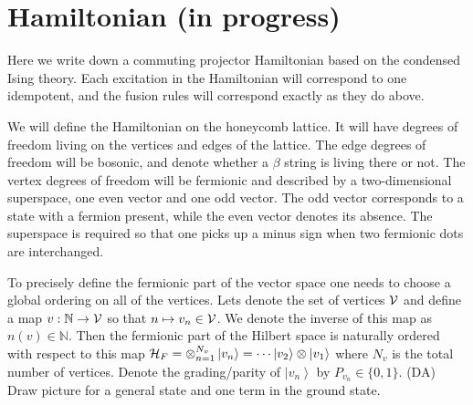 \documentclass[12pt,a4paper]{article}
\newcommand{\tp}{\otimes}
\newcommand{\ket}[1]{\ensuremath{\left|#1\right\rangle}}
\newcommand{\dave}[1]{{\color{ao(english)}\footnotesize{(DA) #1}}}
\newcommand{\remove}[1]{{\color{amber(sae/ece)}\footnotesize{(RM?) #1}}}
\begin{document}

\section{Hamiltonian (in progress)}
Here we write down a commuting projector Hamiltonian based on the condensed Ising theory. 
Each excitation in the Hamiltonian will correspond to one idempotent, and the fusion rules will correspond exactly as they do above. 

We will define the Hamiltonian on the honeycomb lattice. It will have degrees of freedom living on the vertices and edges of the lattice. 
The edge degrees of freedom will be bosonic, and denote whether a $\beta$ string is living there or not. 
The vertex degrees of freedom will be fermionic and described by a two-dimensional superspace, one even vector and one odd vector. 
The odd vector corresponds to a state with a fermion present, while the even vector denotes its absence. 
The superspace is required so that one picks up a minus sign when two fermionic dots are interchanged. 

To precisely define the fermionic part of the vector space one needs to choose a global ordering on all of the vertices. Lets denote the set of vertices $ \cal{V}$ and define a map $v: \mathbb{N} \rightarrow \cal{V}$ so that $n \mapsto v_n \in \cal{V}$. We denote the inverse of this map as $n(v) \in \mathbb{N}$. 
Then the fermionic part of the Hilbert space is naturally ordered with respect to this map ${\cal{H}}_F = \tp_{n=1}^{N_v} \ket{v_n} = \cdots \ket{v_2} \tp \ket{v_1}$ where $N_v$ is the total number of vertices.
Denote the grading/parity of $\ket{v_n}$ by $P_{v_n} \in \{ 0,1\} $.
\dave{Draw picture for a general state and one term in the ground state.}
\end{document}
